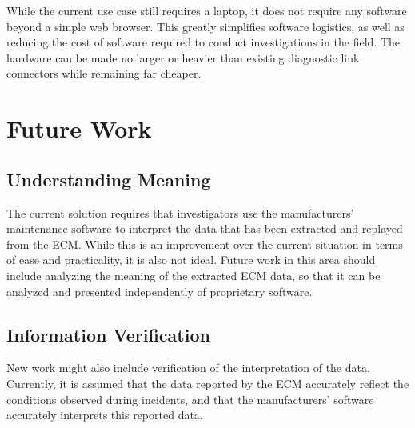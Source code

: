 While the current use case still requires a laptop, it does not require any software beyond a simple web browser. This greatly simplifies software logistics, as well
as reducing the cost of software required to conduct investigations in the field. The hardware can be made no larger or heavier than existing diagnostic link connectors
while remaining far cheaper.

\section{Future Work}

\subsection{Understanding Meaning}

The current solution requires that investigators use the manufacturers' maintenance software to interpret the data that has been extracted and replayed from the ECM.
While this is an improvement over the current situation in terms of ease and practicality, it is also not ideal. Future work in this area should include analyzing the
meaning of the extracted ECM data, so that it can be analyzed and presented independently of proprietary software.

\subsection{Information Verification}

New work might also include verification of the interpretation of the data. Currently, it is assumed that the data reported by the ECM accurately reflect the conditions
observed during incidents, and that the manufacturers' software accurately interprets this reported data. 

